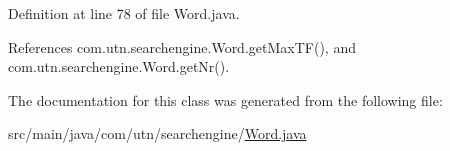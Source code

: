 \-Definition at line 78 of file \-Word.\-java.



\-References com.\-utn.\-searchengine.\-Word.\-get\-Max\-T\-F(), and com.\-utn.\-searchengine.\-Word.\-get\-Nr().



\-The documentation for this class was generated from the following file\-:\begin{DoxyCompactItemize}
\item 
src/main/java/com/utn/searchengine/\hyperlink{_word_8java}{\-Word.\-java}\end{DoxyCompactItemize}
